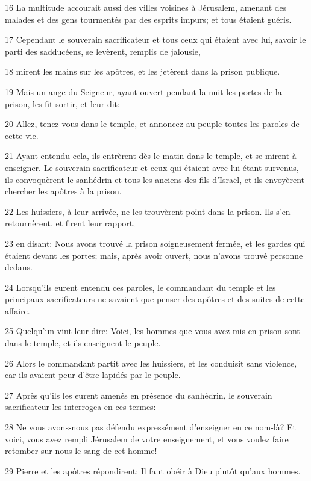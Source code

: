 \par 16 La multitude accourait aussi des villes voisines à Jérusalem, amenant des malades et des gens tourmentés par des esprits impurs; et tous étaient guéris.
\par 17 Cependant le souverain sacrificateur et tous ceux qui étaient avec lui, savoir le parti des sadducéens, se levèrent, remplis de jalousie,
\par 18 mirent les mains sur les apôtres, et les jetèrent dans la prison publique.
\par 19 Mais un ange du Seigneur, ayant ouvert pendant la nuit les portes de la prison, les fit sortir, et leur dit:
\par 20 Allez, tenez-vous dans le temple, et annoncez au peuple toutes les paroles de cette vie.
\par 21 Ayant entendu cela, ils entrèrent dès le matin dans le temple, et se mirent à enseigner. Le souverain sacrificateur et ceux qui étaient avec lui étant survenus, ils convoquèrent le sanhédrin et tous les anciens des fils d'Israël, et ils envoyèrent chercher les apôtres à la prison.
\par 22 Les huissiers, à leur arrivée, ne les trouvèrent point dans la prison. Ils s'en retournèrent, et firent leur rapport,
\par 23 en disant: Nous avons trouvé la prison soigneusement fermée, et les gardes qui étaient devant les portes; mais, après avoir ouvert, nous n'avons trouvé personne dedans.
\par 24 Lorsqu'ils eurent entendu ces paroles, le commandant du temple et les principaux sacrificateurs ne savaient que penser des apôtres et des suites de cette affaire.
\par 25 Quelqu'un vint leur dire: Voici, les hommes que vous avez mis en prison sont dans le temple, et ils enseignent le peuple.
\par 26 Alors le commandant partit avec les huissiers, et les conduisit sans violence, car ils avaient peur d'être lapidés par le peuple.
\par 27 Après qu'ils les eurent amenés en présence du sanhédrin, le souverain sacrificateur les interrogea en ces termes:
\par 28 Ne vous avons-nous pas défendu expressément d'enseigner en ce nom-là? Et voici, vous avez rempli Jérusalem de votre enseignement, et vous voulez faire retomber sur nous le sang de cet homme!
\par 29 Pierre et les apôtres répondirent: Il faut obéir à Dieu plutôt qu'aux hommes.
